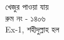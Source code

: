 \documentclass{article}
\begin{document}
\centering
{}
{{\fontsize{110}{132} \selectfont খেজুর পাওয়া যায়\\}{\fontsize{90}{108}\selectfont রুম নং - ১৪০৬\\ Ex-1, শহীদুল্লাহ হল\\}\vspace{2cm}}
\end{document}
